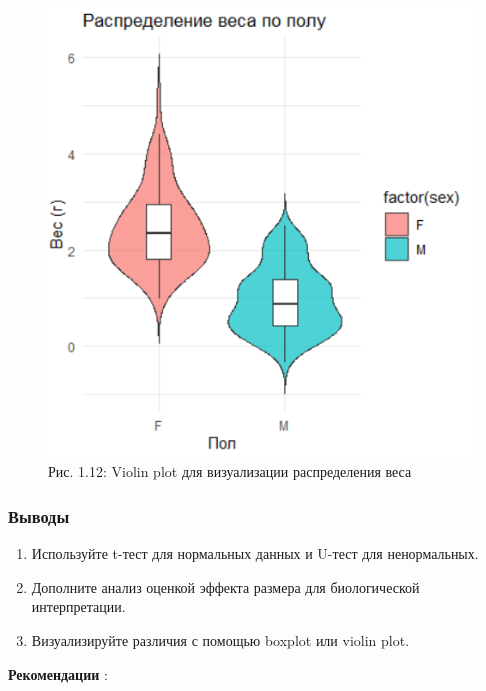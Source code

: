 \documentclass[
  letterpaper,
  DIV=11,
  numbers=noendperiod]{scrreprt}
\begin{document}
\begin{figure}[H]

{\centering \includegraphics[width=0.6\linewidth,height=\textheight,keepaspectratio]{images/violin_shrimp.PNG}

}

\caption{Рис. 1.12: Violin plot для визуализации распределения веса}

\end{figure}%

\subsubsection{\texorpdfstring{\textbf{Выводы}}{Выводы}}\label{ux432ux44bux432ux43eux434ux44b}

\begin{enumerate}
\def\labelenumi{\arabic{enumi}.}
\item
  Используйте t-тест для нормальных данных и U-тест для ненормальных.
\item
  Дополните анализ оценкой эффекта размера для биологической
  интерпретации.
\item
  Визуализируйте различия с помощью boxplot или violin plot.
\end{enumerate}

\textbf{Рекомендации} :
\end{document}
